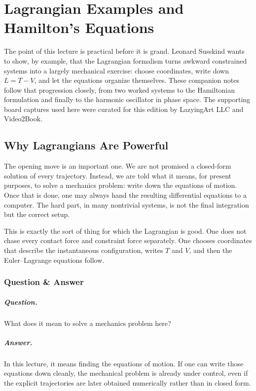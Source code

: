 \chapter{Lagrangian Examples and Hamilton's Equations}

The point of this lecture is practical before it is grand. Leonard Susskind wants to show, by example, that the Lagrangian formalism turns awkward constrained systems into a largely mechanical exercise: choose coordinates, write down \(L=T-V\), and let the equations organize themselves. These companion notes follow that progression closely, from two worked systems to the Hamiltonian formulation and finally to the harmonic oscillator in phase space. The supporting board captures used here were curated for this edition by LazyingArt LLC and Video2Book.

\section{Why Lagrangians Are Powerful}

The opening move is an important one. We are not promised a closed-form solution of every trajectory. Instead, we are told what it means, for present purposes, to solve a mechanics problem: write down the equations of motion. Once that is done, one may always hand the resulting differential equations to a computer. The hard part, in many nontrivial systems, is not the final integration but the correct setup.

This is exactly the sort of thing for which the Lagrangian is good. One does not chase every contact force and constraint force separately. One chooses coordinates that describe the instantaneous configuration, writes \(T\) and \(V\), and then the Euler--Lagrange equations follow.

\subsection{Question \& Answer}

\paragraph{Question.} What does it mean to solve a mechanics problem here?

\paragraph{Answer.} In this lecture, it means finding the equations of motion. If one can write those equations down cleanly, the mechanical problem is already under control, even if the explicit trajectories are later obtained numerically rather than in closed form.

